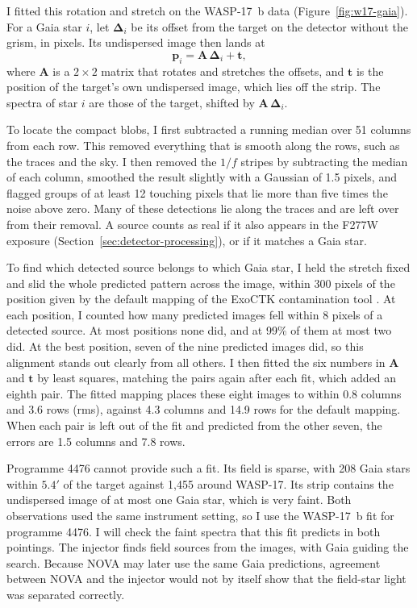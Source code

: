 I fitted this rotation and stretch on the WASP-17~b data
(Figure~\ref{fig:w17-gaia}). For a Gaia star $i$, let
$\boldsymbol{\Delta}_i$ be its offset from the target on the detector without
the grism, in pixels. Its undispersed image then lands at
\begin{equation}
  \mathbf{p}_i = \mathbf{A}\,\boldsymbol{\Delta}_i + \mathbf{t},
  \label{eq:gaia-map}
\end{equation}
where $\mathbf{A}$ is a $2\times2$ matrix that rotates and stretches the
offsets, and $\mathbf{t}$ is the position of the target's own undispersed
image, which lies off the strip. The spectra of star $i$ are those of the
target, shifted by $\mathbf{A}\,\boldsymbol{\Delta}_i$.

To locate the compact blobs, I first subtracted a running median over 51 columns from each row.
This removed everything that is smooth along the rows, such as the traces and
the sky. I then removed the $1/f$ stripes by subtracting the median of each
column, smoothed the result slightly with a Gaussian of 1.5 pixels,
and flagged groups of at least 12 touching pixels that lie more than five
times the noise above zero. Many of these detections lie along the traces and
are left over from their removal. A source counts as real if it also appears
in the F277W exposure (Section~\ref{sec:detector-processing}), or if it matches a Gaia star.

To find which detected source
belongs to which Gaia star, I held the stretch fixed and slid the whole
predicted pattern across the image, within 300 pixels of the position given
by the default mapping of the ExoCTK contamination tool \citep{BourqueEtAl2021}. At each position, I
counted how many predicted images fell within 8 pixels of a detected source.
At most positions none did, and at 99\% of them at most two did. At the best position, seven of the nine predicted images did, so this alignment stands out clearly from all others. I then fitted the six numbers in
$\mathbf{A}$ and $\mathbf{t}$ by least squares, matching the pairs again after each fit, which added an eighth pair. The fitted mapping places these eight images to within 0.8 columns and 3.6 rows
(rms), against 4.3 columns and 14.9 rows for the default mapping. When each pair
is left out of the fit and predicted from the other seven, the errors are 1.5
columns and 7.8 rows.

Programme 4476 cannot provide such a fit. Its field is
sparse, with 208 Gaia stars within $5.4'$ of the target against 1,455 around
WASP-17. Its strip contains the undispersed image of at most one Gaia star,
which is very faint. Both observations used the same instrument setting, so I use
the WASP-17~b fit for programme 4476. I will check the faint spectra that this fit predicts in both pointings. The injector finds field sources from the images, with Gaia guiding the search. Because NOVA may later use the same Gaia predictions, agreement between NOVA and the injector would not by itself show that the field-star light was separated correctly.


